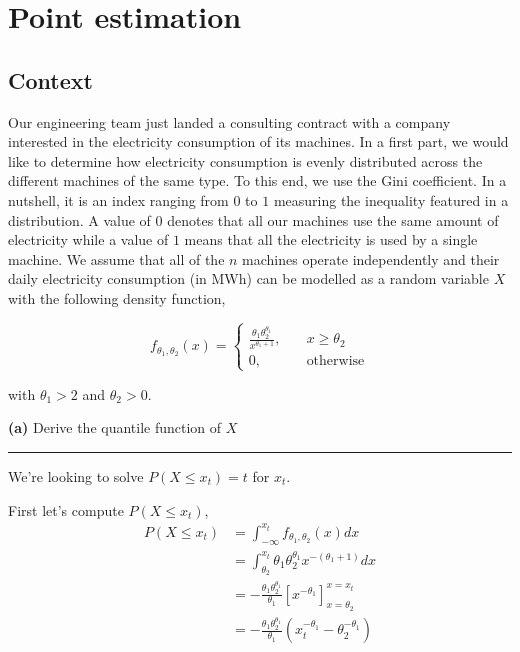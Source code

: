 \documentclass[10pt, a4paper, nofootinbib]{scrartcl}
\begin{document}
\section{Point estimation}

\subsection*{Context}
Our engineering team just landed a consulting contract with a company interested in the electricity consumption of its machines. In a first part, we would like to determine how electricity consumption is evenly distributed across the different machines of the same type. To this end, we use the Gini coefficient. In a nutshell, it is an index ranging from $0$ to $1$ measuring the inequality featured in a distribution. A value of $0$ denotes that all our machines use the same amount of electricity while a value of $1$ means that all the electricity is used by a single machine.
We assume that all of the $n$ machines operate independently and their daily electricity consumption (in MWh) can be modelled as a random variable $X$ with the following density function,

\begin{equation}
  f_{\theta_1, \theta_2}(x) = 
  \begin{cases}
    \frac{\theta_1 \theta_2^{\theta_1}}{x^{\theta_1 + 1}}, &\quad x \geq \theta_2 \\
    0,                                                     &\quad \text{otherwise}
  \end{cases}
\end{equation}

with $\theta_1 > 2$ and $\theta_2 > 0$.

\textbf{(a)} Derive the quantile function of $X$

\begin{center}\rule{6cm}{0.4pt}\end{center}

We're looking to solve $P(X \leq x_t) = t$ for $x_t$.

First let's compute $P(X \leq x_t)$, 
\begin{align*}
  P(X \leq x_t)
    &= \int_{-\infty}^{x_t} f_{\theta_1, \theta_2}(x) dx \\
    &= \int_{\theta_2}^{x_t} \theta_1 \theta_2^{\theta_1} x^{-(\theta_1 + 1)} dx \\
    &= - \frac{\theta_1 \theta_2^{\theta_1}}{\theta_1} \left[ x^{-\theta_1} \right]_{x=\theta_2}^{x=x_t} \\
    &= - \frac{\theta_1 \theta_2^{\theta_1}}{\theta_1} \left( x_t^{-\theta_1} - \theta_2^{-\theta_1} \right) \\
\end{align*}
\end{document}
